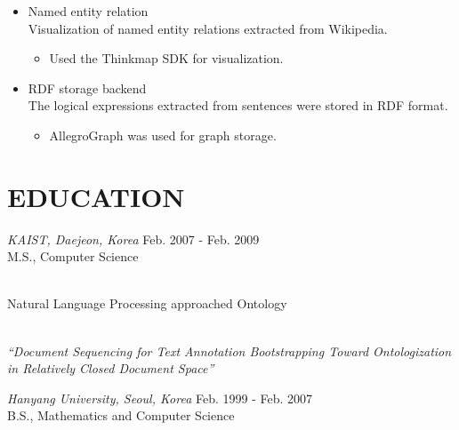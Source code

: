 \documentclass[line,margin]{res}
\begin{document}
\begin{resume}
                    \begin{itemize}  \itemsep 2pt %
                     \item Named entity relation \\ Visualization of named entity relations extracted from Wikipedia.
                           \begin{itemize}
                               \item Used the Thinkmap SDK for visualization.
                           \end{itemize}
                    \end{itemize}
                    \begin{itemize}  \itemsep 2pt %
                     \item  RDF storage backend \\ The logical expressions extracted from sentences were stored in RDF format.
                           \begin{itemize}
                               \item AllegroGraph was used for graph storage.
                           \end{itemize}
                    \end{itemize}

\section{EDUCATION} {\sl KAIST, Daejeon, Korea} \hfill Feb. 2007 - Feb. 2009 \\
                    M.S., Computer Science
                    \begin{description}   \itemsep 2pt %
                           \item[Major] \hfill \\ Natural Language Processing approached Ontology
                           \item[Thesis] \hfill \\
                           {\it ``Document Sequencing for Text Annotation Bootstrapping Toward Ontologization
                                  in Relatively Closed Document Space''}
                    \end{description}
                    {\sl Hanyang University, Seoul, Korea} \hfill Feb. 1999 - Feb. 2007 \\
                    B.S., Mathematics and Computer Science


\end{resume}
\end{document}
